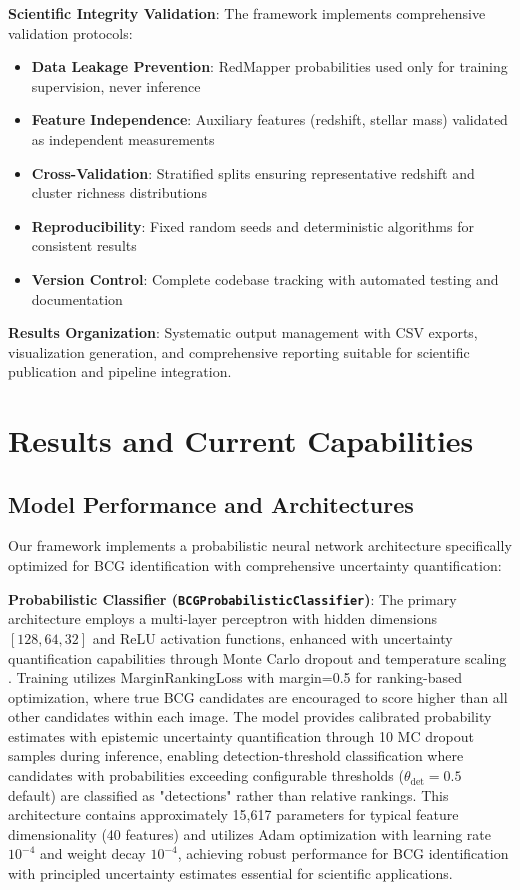 \documentclass[twocolumn,10pt]{aastex631}
\begin{document}
\textbf{Scientific Integrity Validation}: The framework implements comprehensive validation protocols:
\begin{itemize}
\item \textbf{Data Leakage Prevention}: RedMapper probabilities used only for training supervision, never inference
\item \textbf{Feature Independence}: Auxiliary features (redshift, stellar mass) validated as independent measurements
\item \textbf{Cross-Validation}: Stratified splits ensuring representative redshift and cluster richness distributions
\item \textbf{Reproducibility}: Fixed random seeds and deterministic algorithms for consistent results
\item \textbf{Version Control}: Complete codebase tracking with automated testing and documentation
\end{itemize}

\textbf{Results Organization}: Systematic output management with CSV exports, visualization generation, and comprehensive reporting suitable for scientific publication and pipeline integration.

\section{Results and Current Capabilities}

\subsection{Model Performance and Architectures}

Our framework implements a probabilistic neural network architecture specifically optimized for BCG identification with comprehensive uncertainty quantification:

\textbf{Probabilistic Classifier (\texttt{BCGProbabilisticClassifier})}: The primary architecture employs a multi-layer perceptron with hidden dimensions $[128, 64, 32]$ and ReLU activation functions, enhanced with uncertainty quantification capabilities through Monte Carlo dropout \citep{Gal2016MCDropout} and temperature scaling \citep{Laves2019WellCalibratedMU}. Training utilizes MarginRankingLoss with margin=0.5 for ranking-based optimization, where true BCG candidates are encouraged to score higher than all other candidates within each image. The model provides calibrated probability estimates with epistemic uncertainty quantification through 10 MC dropout samples during inference, enabling detection-threshold classification where candidates with probabilities exceeding configurable thresholds ($\theta_{\text{det}} = 0.5$ default) are classified as "detections" rather than relative rankings. This architecture contains approximately 15,617 parameters for typical feature dimensionality (40 features) and utilizes Adam optimization with learning rate $10^{-4}$ and weight decay $10^{-4}$, achieving robust performance for BCG identification with principled uncertainty estimates essential for scientific applications.
\end{document}
